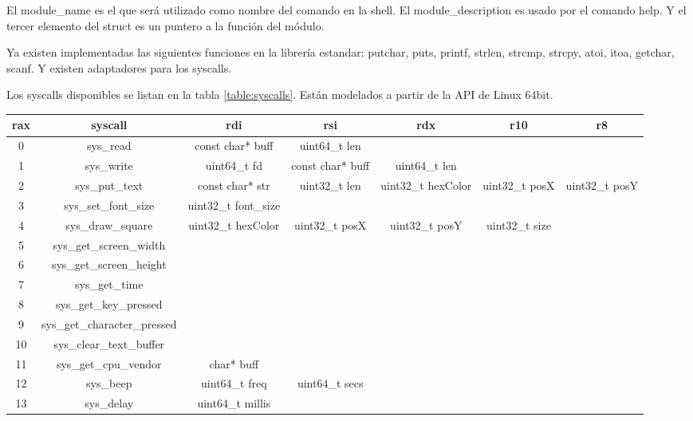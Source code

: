 \documentclass{article}
\begin{document}
El module\_name es el que será utilizado como nombre del comando en la shell. El module\_description es usado por el comando help. Y el tercer elemento del struct es un puntero a la función del módulo.

Ya existen implementadas las siguientes funciones en la librería estandar: putchar, puts, printf, strlen, strcmp, strcpy, atoi, itoa, getchar, scanf. Y existen adaptadores para los syscalls.

Los syscalls disponibles se listan en la tabla \ref{table:syscalls}. Están modelados a partir de la API de Linux 64bit.

\begin{center}
\hspace*{-0.85in}
\begin{tabular}{|c|c|c|c|c|c|c|}
\hline
\textbf{rax} & \textbf{syscall} & \textbf{rdi} & \textbf{rsi} & \textbf{rdx} & \textbf{r10} & \textbf{r8} \\ \hline
0 & sys\_read &  const char* buff & uint64\_t len & & & \\ \hline
1 & sys\_write & uint64\_t fd & const char* buff & uint64\_t len & &  \\ \hline
2 & sys\_put\_text & const char* str & uint32\_t len & uint32\_t hexColor & uint32\_t posX & uint32\_t posY \\ \hline
3 & sys\_set\_font\_size & uint32\_t font\_size & & & &  \\ \hline
4 & sys\_draw\_square & uint32\_t hexColor & uint32\_t posX & uint32\_t posY & uint32\_t size &  \\ \hline
5 & sys\_get\_screen\_width & & & & & \\ \hline
6 & sys\_get\_screen\_height & & & & &   \\ \hline
7 & sys\_get\_time & & & & &   \\ \hline
8 & sys\_get\_key\_pressed & & & & &   \\ \hline
9 & sys\_get\_character\_pressed & & & & &   \\ \hline
10 & sys\_clear\_text\_buffer & & & & &   \\ \hline
11 & sys\_get\_cpu\_vendor & char* buff & & & &   \\ \hline
12 & sys\_beep & uint64\_t freq & uint64\_t secs & & &  \\ \hline
13 & sys\_delay & uint64\_t millis & & & &  \\ \hline
\end{tabular}
\label{table:syscalls}
\end{center}
\end{document}
